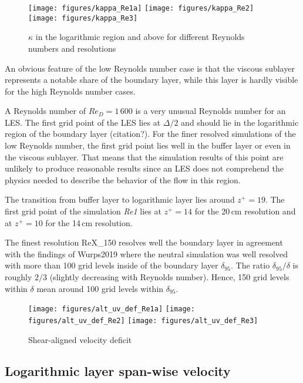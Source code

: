 \documentclass[a4paper,11pt]{article}
\begin{document}
\begin{figure}
  \centerline{
	\texttt{[image: figures/kappa\_Re1a]}
	\texttt{[image: figures/kappa\_Re2]}
	\texttt{[image: figures/kappa\_Re3]}
}
  \caption{$\kappa$ in the logarithmic region and above for different Reynolds numbers and resolutions}
  \label{3Re_kappa}
\end{figure}

An obvious feature of the low Reynolds number case is that the viscous sublayer represents a notable share of the boundary layer, while this layer is hardly visible for the high Reynolds number cases.

A Reynolds number of $Re_D = 1\,600$ is a very unusual Reynolds number for an LES. The first grid point of the LES lies at $\Delta/2$ and should lie in the logarithmic region of the boundary layer (citation?). For the finer resolved simulations of the low Reynolds number, the first grid point lies well in the buffer layer or even in the viscous sublayer. That means that the simulation results of this point are unlikely to produce reasonable results since an LES does not comprehend the physics needed to describe the behavior of the flow in this region.

The transition from buffer layer to logarithmic layer lies around $z^+=19$. The first grid point of the simulation \textit{Re1} lies at $z^+=14$ for the 20\,cm resolution and at $z^+=10$ for the 14\,cm resolution.

The finest resolution ReX\_150 resolves well the boundary layer in agreement with the findings of Wurps2019 where the neutral simulation was well resolved with more than 100 grid levels inside of the boundary layer $\delta_95$. The ratio $\delta_95/\delta$ is roughly $2/3$ (slightly decreasing with Reynolds number). Hence, 150 grid levels within $\delta$ mean around 100 grid levels within $\delta_{95}$. 

\begin{figure}
  \centerline{
	\texttt{[image: figures/alt\_uv\_def\_Re1a]}
	\texttt{[image: figures/alt\_uv\_def\_Re2]}
	\texttt{[image: figures/alt\_uv\_def\_Re3]}
}
  \caption{Shear-aligned velocity deficit}
  \label{3Re_uv_def}
\end{figure}


\subsection{Logarithmic layer span-wise velocity}
\end{document}
